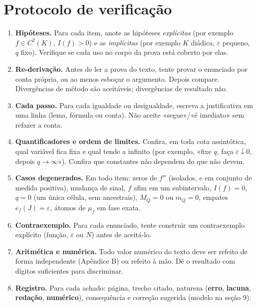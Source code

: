 \documentclass[11pt,a4paper]{article}
\newcommand{\ef}{e_f}
\begin{document}
\section{Protocolo de verificação}
\begin{enumerate}[label=\textbf{R\arabic*.},leftmargin=2.4em]
\item \textbf{Hipóteses.} Para cada item, anote as hipóteses \emph{explícitas} (por exemplo $f\in C^2(K)$, $I(f)>0$) e as \emph{implícitas} (por exemplo $K$ diádica, $\varepsilon$ pequeno, $q$ fixo). Verifique se cada uso no corpo da prova está coberto por elas.
\item \textbf{Re-derivação.} Antes de ler a prova do texto, tente provar o enunciado por conta própria, ou ao menos esboçar o argumento. Depois compare. Divergências de método são aceitáveis; divergências de resultado não.
\item \textbf{Cada passo.} Para cada igualdade ou desigualdade, escreva a justificativa em uma linha (lema, fórmula ou conta). Não aceite «segue»/«é imediato» sem refazer a conta.
\item \textbf{Quantificadores e ordem de limites.} Confira, em toda cota assintótica, qual variável fica fixa e qual tende a infinito (por exemplo, «fixe $q$, faça $\varepsilon\downarrow0$, depois $q\to\infty$»). Confira que constantes não dependem do que não devem.
\item \textbf{Casos degenerados.} Em todo item: zeros de $f''$ (isolados, e em conjunto de medida positiva), mudança de sinal, $f$ afim em um subintervalo, $I(f)=0$, $q=0$ (um única célula, sem ancestrais), $M_Q=0$ ou $m_Q=0$, empates $\ef(J)=\varepsilon$, átomos de $\mu_f$ em fase exata.
\item \textbf{Contraexemplo.} Para cada enunciado, tente construir um contraexemplo explícito (função, $\varepsilon$ ou $N$) antes de aceitá-lo.
\item \textbf{Aritmética e numérica.} Todo valor numérico do texto deve ser refeito de forma independente (Apêndice B) ou refeito à mão. Dê o resultado com dígitos suficientes para discriminar.
\item \textbf{Registro.} Para cada achado: página, trecho citado, natureza (\textbf{erro}, \textbf{lacuna}, \textbf{redação}, \textbf{numérico}), consequência e correção sugerida (modelo na seção 9).
\end{enumerate}
\end{document}
